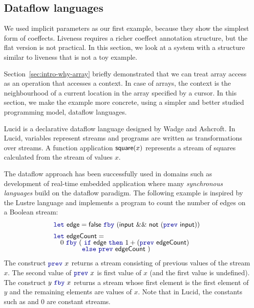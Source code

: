 
\subsection{Dataflow languages}
\label{sec:applications-flat-dataflow}

We used implicit parameters as our first example, because they show the simplest form of coeffects.
Liveness requires a richer coeffect annotation structure, but the flat version is not practical.
In this section, we look at a system with a structure similar to liveness that is not a toy example.

Section~\ref{sec:intro-why-array} briefly demonstrated that we can treat array access as an
operation that accesses a context. In case of arrays, the context is the neighbourhood of a current
location in the array specified by a cursor. In this section, we make the example more concrete,
using a simpler and better studied programming model, dataflow languages.

Lucid \cite{app-lucid} is a declarative dataflow language designed by Wadge and Ashcroft. In Lucid,
variables represent streams and programs are written as transformations over streams. A function
application $\textnormal{\sffamily square}(x)$ represents a stream of squares calculated from the stream of values $x$.

The dataflow approach has been successfully used in domains such as development of real-time embedded
application where many \emph{synchronous languages} \cite{app-synchronous-lang} build on the dataflow
paradigm. The following example is inspired by the Lustre \cite{app-synchronous-lustre} language
and implements a program to count the number of edges on a Boolean stream:
%
\begin{equation*}
\begin{array}{l}
\kvd{let}~\ident{edge} = \ident{false}~\kvd{fby}~(\ident{input}~\&\&~\ident{not}~(\kvd{prev}~\ident{input}))
\\[0.5em]
\kvd{let}~\ident{edgeCount} = \\[-0.25em]
\quad 0~\kvd{fby}~ (~\kvd{if}~\ident{edge}~\kvd{then}~1 + (\kvd{prev}~\ident{edgeCount})\\[-0.25em]
\quad\quad\quad~~~\, \kvd{else}~\kvd{prev}~\ident{edgeCount} ~)
\end{array}
\end{equation*}
%
The construct $\kvd{prev}~x$ returns a stream consisting of previous values of the stream
$x$. The second value of $\kvd{prev}~x$ is first value of $x$ (and the first
value is undefined). The construct $y~\kvd{fby}~x$ returns a stream whose first element is the
first element of $y$ and the remaining elements are values of $x$. Note that in Lucid, the constants
such as  and $0$ are constant streams.

